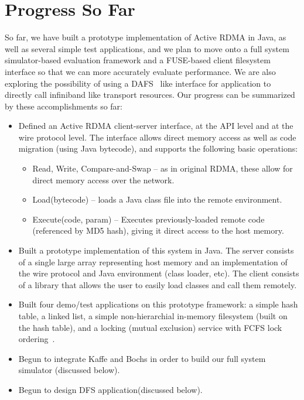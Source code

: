 \documentclass[10pt]{article}
\begin{document}
\section{Progress So Far}

So far, we have built a prototype implementation of Active RDMA in
Java, as well as several simple test applications, and we plan to move
onto a full system simulator-based evaluation framework and a
FUSE-based client filesystem interface so that we can more accurately
evaluate performance. We are also exploring the possibility of using
a DAFS~\cite{DAFS} like interface for application to directly call
infiniband like transport resources. Our progress can be summarized by
these accomplishments so far:

\begin{itemize}
\item Defined an Active RDMA client-server interface, at the API level
  and at the wire protocol level. The interface allows direct memory
  access as well as code migration (using Java bytecode), and supports the following basic operations:
  \begin{itemize}
  \item Read, Write, Compare-and-Swap -- as in original RDMA, these
    allow for direct memory access over the network.
  \item Load(bytecode) -- loads a Java class file into the remote
    environment.
  \item Execute(code, param) -- Executes previously-loaded remote code
    (referenced by MD5 hash), giving it direct access to the host
    memory.
  \end{itemize}
\item Built a prototype implementation of this system in Java. The
  server consists of a single large array representing host memory and
  an implementation of the wire protocol and Java environment (class
  loader, etc). The client consists of a library that allows the user
  to easily load classes and call them remotely.
\item Built four demo/test applications on this prototype framework: a simple
  hash table, a linked list, a simple non-hierarchial in-memory filesystem
  (built on the hash table), and a locking (mutual exclusion) service with
  FCFS lock ordering~\cite{nic-basedatomic}.
\item Begun to integrate Kaffe and Bochs in order to build our full
  system simulator (discussed below).
  \item Begun to design DFS application(discussed below).
\end{itemize}
\end{document}
